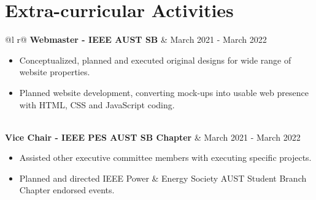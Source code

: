 \documentclass[a4paper,12pt]{article}
\begin{document}
\section{Extra-curricular Activities}
\begin{tabularx}{\linewidth}{ @{}l r@{} }
\textbf{Webmaster - IEEE AUST SB} & \hfill March 2021 - March 2022\\[3.75pt]
{\begin{itemize}
    \item Conceptualized, planned and executed original designs for wide range of website properties.
    \item Planned website development, converting mock-ups into usable web presence with HTML, CSS and JavaScript coding.
    
\end{itemize}}  \\
\textbf{Vice Chair - IEEE PES AUST SB Chapter} & \hfill March 2021 - March 2022\\[3.75pt]
{\begin{itemize}
    \item Assisted other executive committee members with executing specific projects.
    \item Planned and directed IEEE Power \& Energy Society AUST Student Branch Chapter endorsed events.

\end{itemize}}  \\
   

\end{tabularx}

\vfill
{}
\end{document}
